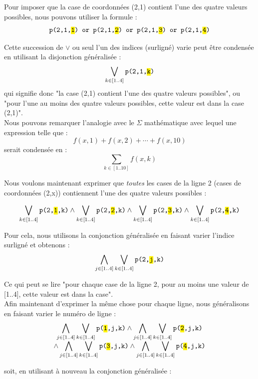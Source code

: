 Pour imposer que la case de coordonnées (2,1) contient l'une des quatre valeurs possibles, nous pouvons utiliser la formule : \\
\[\texttt{p(2,1,\hl{1}) or p(2,1,\hl{2}) or p(2,1,\hl{3}) or p(2,1,\hl{4})}\]

Cette succession de $\vee$ ou seul l'un des indices (surligné) varie peut être condensée en utilisant la disjonction généralisée :%
\[\bigvee_{k\in [1..4]} \texttt{p(2,1,\hl{k})} \]
qui signifie donc "la case (2,1) contient l'une des quatre valeurs possibles", ou "pour l'une au moins des quatre valeurs possibles, cette valeur est dans la case (2,1)". \\

\noindent Nous pouvons remarquer l'analogie avec le $\Sigma$ mathématique avec lequel une expression telle que : 
\[f(x,1)+f(x,2)+\cdots+f(x,10)\]
serait condensée en :
\[\sum_{k\in[1..10]} f(x,k)\]


Nous voulons maintenant exprimer que \emph{toutes} les cases de la ligne 2 (cases de coordonnées (2,x)) contiennent l'une des quatre valeurs possibles : 

\[\bigvee_{k\in [1..4]} \texttt{p(2,\hl{1},k)} \wedge \bigvee_{k\in [1..4]} \texttt{p(2,\hl{2},k)}\wedge
\bigvee_{k\in [1..4]} \texttt{p(2,\hl{3},k)} \wedge
\bigvee_{k\in [1..4]} \texttt{p(2,\hl{4},k)}\] 

Pour cela, nous utilisons la conjonction généralisée %
en faisant varier l'indice surligné et obtenons : 
\[\bigwedge_{j\in [1..4]}\bigvee_{k\in [1..4]} \texttt{p(2,\hl{j},k)}\]

Ce qui peut se lire "pour chaque case de la ligne 2, pour au moins une valeur de [1..4], cette valeur est dans la case".\\

Afin maintenant d'exprimer la même chose pour chaque ligne, nous généralisons en faisant varier le numéro de ligne : 
\[\begin{matrix}\displaystyle\bigwedge_{j\in [1..4]}\bigvee_{k\in [1..4]} \texttt{p(\hl{1},j,k)}\wedge \bigwedge_{j\in [1..4]}\bigvee_{k\in [1..4]} \texttt{p(\hl{2},j,k)}\\\displaystyle\wedge \bigwedge_{j\in [1..4]}\bigvee_{k\in [1..4]} \texttt{p(\hl{3},j,k)}\wedge \bigwedge_{j\in [1..4]}\bigvee_{k\in [1..4]} \texttt{p(\hl{4},j,k)}\end{matrix}\]

soit, en utilisant à nouveau la conjonction généralisée :%

